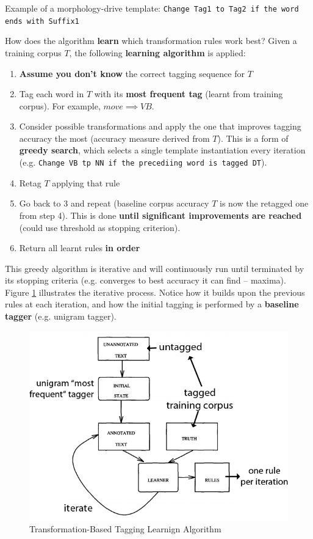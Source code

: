 \documentclass{article}
\begin{document}
Example of a morphology-drive template: \texttt{Change Tag1 to Tag2 if the word ends with Suffix1}

How does the algorithm \textbf{learn} which transformation rules work best? Given a training corpus $T$, the following \textbf{learning algorithm} is applied:
\begin{enumerate}
	\item \textbf{Assume you don't know} the correct tagging sequence for $T$
	\item Tag each word in $T$  with its \textbf{most frequent tag} (learnt from training corpus). For example, $move \implies VB$.
	\item Consider  possible transformations and apply the one that improves tagging accuracy the most (accuracy measure derived from $T$). This is a form of \textbf{greedy search}, which selects a single template instantiation every iteration (e.g. \texttt{Change VB tp NN if the precediing word is tagged DT}).
	\item Retag $T$ applying that rule
	\item Go back to 3 and repeat (baseline corpus accuracy $T$ is now the retagged one from step 4). This is done \textbf{until significant improvements are reached} (could use threshold as stopping criterion).
	\item Return all learnt rules \textbf{in order}
\end{enumerate}
This greedy algorithm is iterative and will continuously run until terminated by its stopping criteria (e.g. converges to best accuracy it can find -- maxima). Figure \ref{fig:transformed-based-tagging} illustrates the iterative process. Notice how it builds upon the previous rules at each iteration, and how the initial tagging is performed by a \textbf{baseline tagger} (e.g. unigram tagger).

\begin{figure}
	\centering
	\includegraphics[scale=0.4]{figures/transformed-based-tagger.png}
	\caption{Transformation-Based Tagging Learnign Algorithm}
	\label{fig:transformed-based-tagging}
\end{figure}
\end{document}
